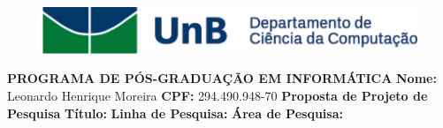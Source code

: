 \documentclass[a4paper,12pt]{article}
\begin{document}
\newcommand{\linhaDupla}{\newline \newline}


\begin{figure}
\thispagestyle{empty}
 \includegraphics[width=\textwidth]{images/logoUnB.png}
\end{figure}
\textbf{PROGRAMA DE PÓS-GRADUAÇÃO EM INFORMÁTICA}
\linhaDupla
\textbf{Nome:} Leonardo Henrique Moreira
\linhaDupla
\textbf{CPF:} 294.490.948-70
\linhaDupla
\textbf{Proposta de Projeto de Pesquisa}
\linhaDupla
\textbf{Título:}
\linhaDupla
\textbf{Linha de Pesquisa:}
\newline
\indent\textbf{Área de Pesquisa:}

\newpage
\end{document}
